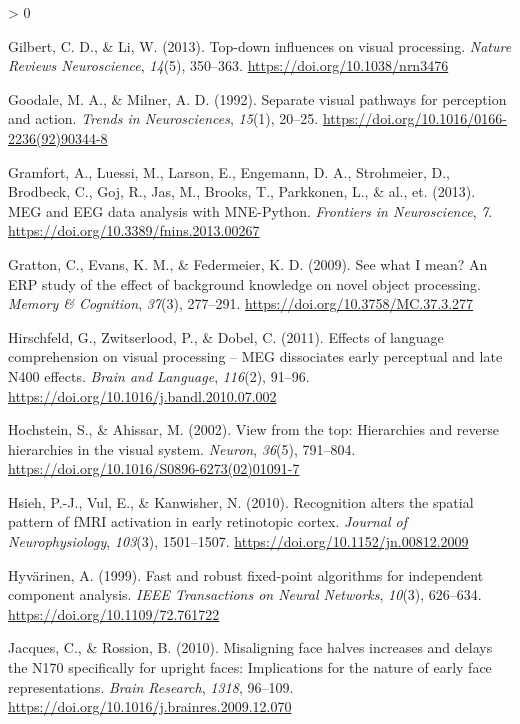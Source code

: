 \documentclass[
  english,
  doc,12pt,twoside,floatsintext]{apa7}
\newlength{\cslhangindent}
\newenvironment{CSLReferences}[2] %
 {%
  \setlength{\parindent}{0pt}
  \ifodd #1 \everypar{\setlength{\hangindent}{\cslhangindent}}\ignorespaces\fi
  \ifnum #2 > 0
  \setlength{\parskip}{#2\baselineskip}
  \fi
 }%
 {}
\begin{document}
\begin{CSLReferences}{1}{0}
\leavevmode\hypertarget{ref-gilbert2013}{}%
Gilbert, C. D., \& Li, W. (2013). Top-down influences on visual processing. \emph{Nature Reviews Neuroscience}, \emph{14}(5), 350--363. \url{https://doi.org/10.1038/nrn3476}

\leavevmode\hypertarget{ref-goodale1992}{}%
Goodale, M. A., \& Milner, A. D. (1992). Separate visual pathways for perception and action. \emph{Trends in Neurosciences}, \emph{15}(1), 20--25. \url{https://doi.org/10.1016/0166-2236(92)90344-8}

\leavevmode\hypertarget{ref-gramfort2013}{}%
Gramfort, A., Luessi, M., Larson, E., Engemann, D. A., Strohmeier, D., Brodbeck, C., Goj, R., Jas, M., Brooks, T., Parkkonen, L., \& al., et. (2013). MEG and {EEG} data analysis with {MNE-Python}. \emph{Frontiers in Neuroscience}, \emph{7}. \url{https://doi.org/10.3389/fnins.2013.00267}

\leavevmode\hypertarget{ref-gratton2009}{}%
Gratton, C., Evans, K. M., \& Federmeier, K. D. (2009). See what {I} mean? An {ERP} study of the effect of background knowledge on novel object processing. \emph{Memory \& Cognition}, \emph{37}(3), 277--291. \url{https://doi.org/10.3758/MC.37.3.277}

\leavevmode\hypertarget{ref-hirschfeld2011}{}%
Hirschfeld, G., Zwitserlood, P., \& Dobel, C. (2011). Effects of language comprehension on visual processing -- MEG dissociates early perceptual and late N400 effects. \emph{Brain and Language}, \emph{116}(2), 91--96. \url{https://doi.org/10.1016/j.bandl.2010.07.002}

\leavevmode\hypertarget{ref-hochstein2002}{}%
Hochstein, S., \& Ahissar, M. (2002). View from the top: Hierarchies and reverse hierarchies in the visual system. \emph{Neuron}, \emph{36}(5), 791--804. \url{https://doi.org/10.1016/S0896-6273(02)01091-7}

\leavevmode\hypertarget{ref-hsieh2010}{}%
Hsieh, P.-J., Vul, E., \& Kanwisher, N. (2010). Recognition alters the spatial pattern of {fMRI} activation in early retinotopic cortex. \emph{Journal of Neurophysiology}, \emph{103}(3), 1501--1507. \url{https://doi.org/10.1152/jn.00812.2009}

\leavevmode\hypertarget{ref-hyvuxe4rinen1999}{}%
Hyvärinen, A. (1999). Fast and robust fixed-point algorithms for independent component analysis. \emph{IEEE Transactions on Neural Networks}, \emph{10}(3), 626--634. \url{https://doi.org/10.1109/72.761722}

\leavevmode\hypertarget{ref-jacques2010}{}%
Jacques, C., \& Rossion, B. (2010). Misaligning face halves increases and delays the {N170} specifically for upright faces: Implications for the nature of early face representations. \emph{Brain Research}, \emph{1318}, 96--109. \url{https://doi.org/10.1016/j.brainres.2009.12.070}


\end{CSLReferences}
\end{document}
